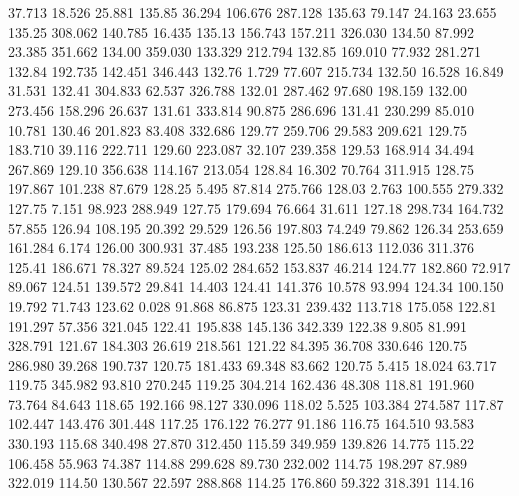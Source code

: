   37.713   18.526   25.881       135.85
  36.294  106.676  287.128       135.63
  79.147   24.163   23.655       135.25
 308.062  140.785   16.435       135.13
 156.743  157.211  326.030       134.50
  87.992   23.385  351.662       134.00
 359.030  133.329  212.794       132.85
 169.010   77.932  281.271       132.84
 192.735  142.451  346.443       132.76
   1.729   77.607  215.734       132.50
  16.528   16.849   31.531       132.41
 304.833   62.537  326.788       132.01
 287.462   97.680  198.159       132.00
 273.456  158.296   26.637       131.61
 333.814   90.875  286.696       131.41
 230.299   85.010   10.781       130.46
 201.823   83.408  332.686       129.77
 259.706   29.583  209.621       129.75
 183.710   39.116  222.711       129.60
 223.087   32.107  239.358       129.53
 168.914   34.494  267.869       129.10
 356.638  114.167  213.054       128.84
  16.302   70.764  311.915       128.75
 197.867  101.238   87.679       128.25
   5.495   87.814  275.766       128.03
   2.763  100.555  279.332       127.75
   7.151   98.923  288.949       127.75
 179.694   76.664   31.611       127.18
 298.734  164.732   57.855       126.94
 108.195   20.392   29.529       126.56
 197.803   74.249   79.862       126.34
 253.659  161.284    6.174       126.00
 300.931   37.485  193.238       125.50
 186.613  112.036  311.376       125.41
 186.671   78.327   89.524       125.02
 284.652  153.837   46.214       124.77
 182.860   72.917   89.067       124.51
 139.572   29.841   14.403       124.41
 141.376   10.578   93.994       124.34
 100.150   19.792   71.743       123.62
   0.028   91.868   86.875       123.31
 239.432  113.718  175.058       122.81
 191.297   57.356  321.045       122.41
 195.838  145.136  342.339       122.38
   9.805   81.991  328.791       121.67
 184.303   26.619  218.561       121.22
  84.395   36.708  330.646       120.75
 286.980   39.268  190.737       120.75
 181.433   69.348   83.662       120.75
   5.415   18.024   63.717       119.75
 345.982   93.810  270.245       119.25
 304.214  162.436   48.308       118.81
 191.960   73.764   84.643       118.65
 192.166   98.127  330.096       118.02
   5.525  103.384  274.587       117.87
 102.447  143.476  301.448       117.25
 176.122   76.277   91.186       116.75
 164.510   93.583  330.193       115.68
 340.498   27.870  312.450       115.59
 349.959  139.826   14.775       115.22
 106.458   55.963   74.387       114.88
 299.628   89.730  232.002       114.75
 198.297   87.989  322.019       114.50
 130.567   22.597  288.868       114.25
 176.860   59.322  318.391       114.16
